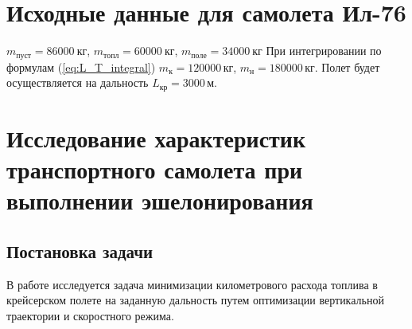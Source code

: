 \documentclass[bachelor,subf,14pt, substylefile = spbu.rtx]{disser}
\begin{document}

\section{Исходные данные для самолета Ил-76}

$m_{пуст} = 86000\ \text{кг}$, $m_{топл}= 60000\ \text{кг}$, $m_{поле}=34000\ \text{кг}$
При интегрировании по формулам (\ref{eq:L_T_integral}) $m_{к}=120000\, кг$, $m_{н}=180000\, кг$.
Полет будет осуществляется на дальность $L_{кр} = 3000 \, м$.

\section{Исследование характеристик транспортного самолета при выполнении эшелонирования}
\subsection{Постановка задачи}
В работе исследуется задача минимизации километрового расхода топлива в крейсерском полете на заданную дальность путем оптимизации вертикальной траектории и скоростного режима.




\end{document}

